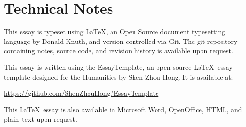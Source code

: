 
\section*{Technical Notes}
This essay is typeset using \LaTeX, an Open Source document typesetting language
by Donald Knuth, and version-controlled via Git. The git repository containing notes, source code, and revision history is available upon request.


\noindent
This essay is written using the EssayTemplate, an open source \LaTeX\ essay
template designed for the Humanities by Shen Zhou Hong. It is available at:

\url{https://github.com/ShenZhouHong/EssayTemplate}

\vfill
\begin{center}
This \LaTeX\ essay is also available in Microsoft Word, OpenOffice, HTML, and \mbox{plain text} upon request.
\end{center}
